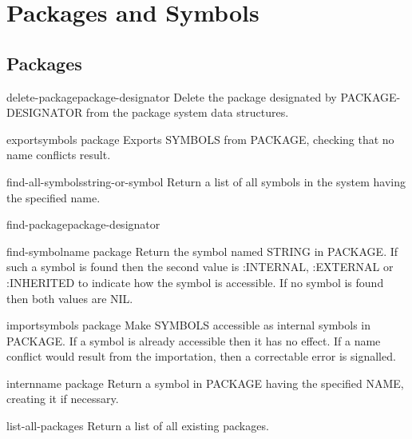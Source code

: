 \chapter{Packages and Symbols}

\section{Packages}

\begin{function}{delete-package}{package-designator}{}{}
  Delete the package designated by PACKAGE-DESIGNATOR from the package
  system data structures.
\end{function}

\begin{function}{export}{symbols \op package}{}{}
  Exports SYMBOLS from PACKAGE, checking that no name conflicts result.
\end{function}

\begin{function}{find-all-symbols}{string-or-symbol}{}{}
  Return a list of all symbols in the system having the specified name.
\end{function}

\begin{function}{find-package}{package-designator}{}{}
  
\end{function}

\begin{function}{find-symbol}{name \op package}{}{}
  Return the symbol named STRING in PACKAGE. If such a symbol is found
  then the second value is :INTERNAL, :EXTERNAL or :INHERITED to indicate
  how the symbol is accessible. If no symbol is found then both values
  are NIL.
\end{function}

\begin{function}{import}{symbols \op package}{}{}
  Make SYMBOLS accessible as internal symbols in PACKAGE. If a symbol is
already accessible then it has no effect. If a name conflict would result from
the importation, then a correctable error is signalled.
\end{function}

\begin{function}{intern}{name \op package}{}{}
  Return a symbol in PACKAGE having the specified NAME, creating it
  if necessary.
\end{function}

\begin{function}{list-all-packages}{}{}{}
  Return a list of all existing packages.
\end{function}


